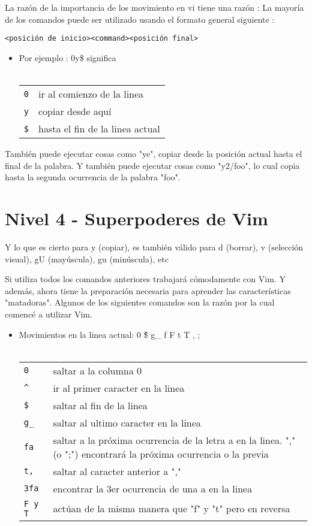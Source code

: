 \documentclass[12pt]{article}
\begin{document}
La razón de la importancia de los movimiento en vi tiene una razón :
La mayoría de los comandos puede ser utilizado usando el formato general siguiente :

\texttt{<posición de inicio><command><posición final>}


\begin{itemize}
	\item Por ejemplo : 0y\$ significa \\ \\
\begin{tabular}{ l l }
	\texttt{0} & ir al comienzo de la linea \\
	\texttt{y} & copiar desde aquí \\
	\texttt{\$} & hasta el fin de la linea actual \\
\end{tabular}
\end{itemize}



También puede ejecutar cosas como "ye", copiar desde la posición actual hasta el final de la palabra.
Y también puede ejecutar cosas como "y2/foo", lo cual copia hasta la segunda ocurrencia de la palabra "foo".


\section{Nivel 4 - Superpoderes de Vim}

Y lo que es cierto para y (copiar), es también válido para d (borrar), v (selección visual), gU (mayúscula), gu (minúscula), etc


Si utiliza todos los comandos anteriores trabajará cómodamente con Vim.
Y además, ahora tiene la preparación necesaria para aprender las características "matadoras".
Algunos de los siguientes comandos son la razón por la cual comencé a utilizar Vim.



\begin{itemize}
	\item Movimientos en la linea actual:  0 \^ \$ g\_ f F t T , ; \\ \\
\begin{tabular}{ l l }
	\texttt{0} & saltar a la columna 0 \\
	\texttt{\^} & ir al primer caracter en la linea \\
	\texttt{\$} & saltar al fin de la linea \\
	\texttt{g\_} & saltar al ultimo caracter en la linea \\
	\texttt{fa} & saltar a la próxima ocurrencia de la letra a en la linea. "," (o ";") encontrará la próxima ocurrencia o la previa \\

	\texttt{t,} & saltar al caracter anterior a "," \\
	\texttt{3fa} & encontrar la 3er ocurrencia de una a en la linea \\
	\texttt{F y T} & actúan de la misma manera que "f" y "t" pero en reversa \\
\end{tabular}
\end{itemize}
\end{document}
